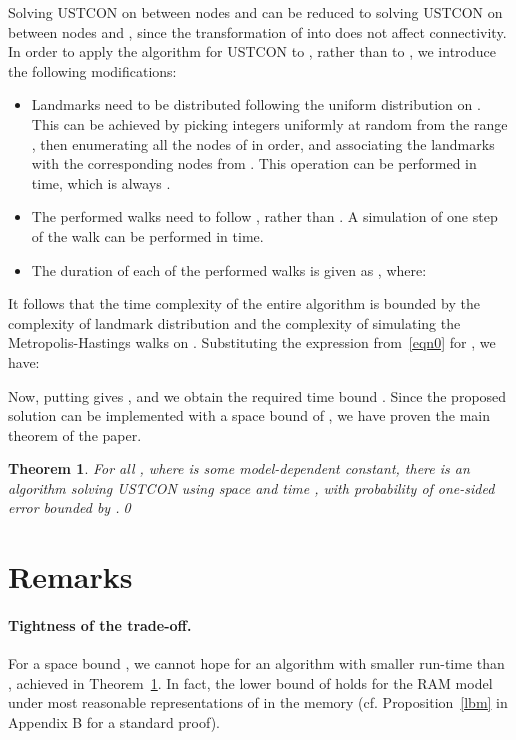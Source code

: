 \documentclass[11pt,a4paper]{article}
\newtheorem{theorem}{Theorem}
\renewcommand{\*}{\hspace*{5mm}}
\begin{document}
Solving USTCON on  between nodes  and  can be reduced to solving USTCON on  between nodes  and , since the transformation of  into  does not affect connectivity. In order to apply the algorithm for USTCON to , rather than to , we introduce the following modifications:
\begin{itemize}
\item Landmarks need to be distributed following the uniform distribution on . This can be achieved by picking  integers uniformly at random from the range , then enumerating all the nodes of  in order, and associating the landmarks with the corresponding nodes from . This operation can be performed in  time, which is always .
\item The performed walks need to follow , rather than . A simulation of one step of the walk  can be performed in  time.
\item The duration of each of the performed walks is given as , where:

\end{itemize}
It follows that the time complexity of the entire algorithm is bounded by the  complexity of landmark distribution and the  complexity of simulating the Metropolis-Hastings walks on . Substituting the expression from~\eqref{eqn0} for , we have:

Now, putting  gives , and we obtain the required time bound . Since the proposed solution can be implemented with a space bound of , we have proven the main theorem of the paper.

\begin{theorem}\label{thm:main}
For all , where  is some model-dependent constant, there is an algorithm solving USTCON using space  and time , with probability of one-sided error bounded by .\qed
\end{theorem}


\section{Remarks}\label{sec5}

\paragraph{Tightness of the trade-off.}\label{sec51}

For a space bound , we cannot hope for an algorithm with smaller run-time than , achieved in Theorem~\ref{thm:main}.
In fact, the lower bound of  holds for the RAM model under most reasonable representations of  in the memory (cf. Proposition~\ref{lbm} in Appendix B for a standard proof).
\end{document}
